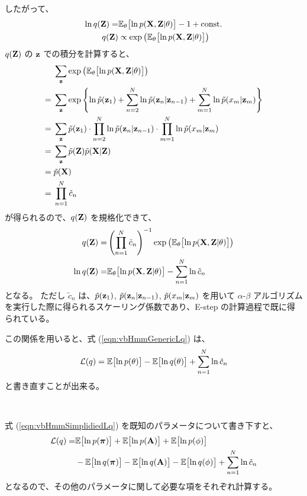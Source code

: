 したがって、
\begin{align}
  \ln q({\bf Z})  =&  \mathbb{E}_\theta\bigl[\ln p({\bf X}, {\bf Z} | \theta) \bigr] - 1 + {\rm const.}  \\
  q({\bf Z})  &\propto  \exp\left( \mathbb{E}_\theta\bigl[\ln p({\bf X}, {\bf Z} | \theta) \bigr] \right)
\end{align}
$q({\bf Z})$ の ${\bf z}$ での積分を計算すると、
\begin{align}
  & \; \sum_{\bf z} \exp\left( \mathbb{E}_\theta\bigl[\ln p({\bf X}, {\bf Z} | \theta) \bigr] \right)  \\
%
    =& \; \sum_{\bf z} \exp\left\{ \ln \tilde{p}({\bf z}_1) + \sum_{n=2}^N \ln \tilde{p}({\bf z}_n | {\bf z}_{n-1}) + \sum_{m=1}^N \ln \tilde{p}(x_m | {\bf z}_m) \right\}  \\
%
    =& \; \sum_{\bf z} \tilde{p}({\bf z}_1) \cdot \prod_{n=2}^N \ln \tilde{p}({\bf z}_n | {\bf z}_{n-1}) \cdot \prod_{m=1}^N \ln \tilde{p}(x_m | {\bf z}_m)  \\
%
    =& \; \sum_{\bf z}  \tilde{p}({\bf Z}) \tilde{p}({\bf X} | {\bf Z})  \\
%
    =& \; \tilde{p}({\bf X})  \\
%
    =& \; \prod_{n=1}^N \tilde{c}_n
\end{align}
が得られるので、$q({\bf Z})$ を規格化できて、
\begin{align}
  q({\bf Z})  =&  \left( \prod_{n=1}^N \tilde{c}_n \right)^{-1} \exp\left( \mathbb{E}_\theta\bigl[\ln p({\bf X}, {\bf Z} | \theta) \bigr] \right)  \\
%
  \ln q({\bf Z})  =&  \mathbb{E}_\theta\bigl[\ln p({\bf X}, {\bf Z} | \theta) \bigr] - \sum_{n=1}^N \ln \tilde{c}_n  
\end{align}
となる。
ただし $\tilde{c}_n$ は、$\tilde{p}({\bf z}_1)$, $\tilde{p}({\bf z}_n | {\bf z}_{n-1})$, $\tilde{p}(x_m | {\bf z}_m)$ を用いて $\alpha$-$\beta$ アルゴリズムを実行した際に得られるスケーリング係数であり、E-step の計算過程で既に得られている。

この関係を用いると、式 (\ref{eqn:vbHmmGenericLq}) は、
\begin{equation}
  {\cal L}(q)  =  \mathbb{E}\bigl[\ln p(\theta) \bigr] - \mathbb{E}\bigl[\ln q(\theta) \bigr] + \sum_{n=1}^N \ln \tilde{c}_n  \label{eqn:vbHmmSimplidiedLq}  
\end{equation}
と書き直すことが出来る。

\

式 (\ref{eqn:vbHmmSimplidiedLq}) を既知のパラメータについて書き下すと、
\begin{align}
  {\cal L}(q)  =&  \mathbb{E}\bigl[\ln p({\boldsymbol \pi}) \bigr] + \mathbb{E}\bigl[\ln p({\bf A}) \bigr] + \mathbb{E}\bigl[\ln p(\phi) \bigr]  \notag  \\  
    &  - \mathbb{E}\bigl[\ln q({\boldsymbol \pi}) \bigr] - \mathbb{E}\bigl[\ln q({\bf A}) \bigr] - \mathbb{E}\bigl[\ln q( \phi ) \bigr] + \sum_{n=1}^N \ln \tilde{c}_n  \label{eqn:vbHmmLq}  
\end{align}
となるので、その他のパラメータに関して必要な項をそれぞれ計算する。

